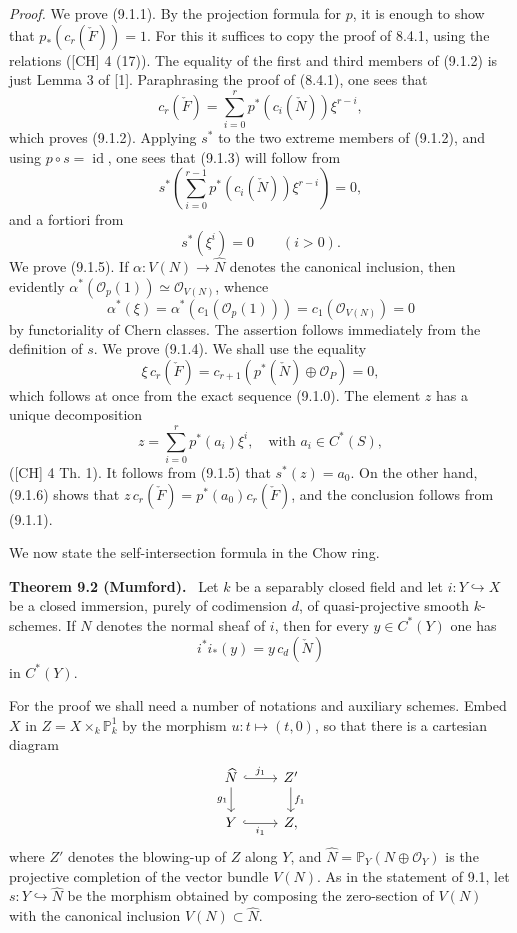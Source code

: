\documentclass[11pt]{article}
\newenvironment{statement}[1]{\par\medskip\noindent\textbf{#1.}\ }{\par\medskip}
\begin{document}
\emph{Proof.} We prove (9.1.1). By the projection formula for $p$, it is enough to show that $p_*(c_r(\check F))=1$. For this it suffices to copy the proof of 8.4.1, using the relations ([CH] 4 (17)). The equality of the first and third members of (9.1.2) is just Lemma 3 of [1]. Paraphrasing the proof of (8.4.1), one sees that
\[
c_r(\check F)=\sum_{i=0}^r p^*(c_i(\check N))\xi^{r-i},
\tag{9.1.2 bis}
\]
which proves (9.1.2). Applying $s^*$ to the two extreme members of (9.1.2), and using $p\circ s=\operatorname{id}$, one sees that (9.1.3) will follow from
\[
s^*\left(\sum_{i=0}^{r-1}p^*(c_i(\check N))\xi^{r-i}\right)=0,
\]
and a fortiori from
\[
s^*(\xi^i)=0\qquad(i>0).
\tag{9.1.5}
\]
We prove (9.1.5). If $\alpha:V(N)\to\widehat N$ denotes the canonical inclusion, then evidently $\alpha^*(\mathcal O_p(1))\simeq\mathcal O_{V(N)}$, whence
\[
\alpha^*(\xi)=\alpha^*(c_1(\mathcal O_p(1)))=c_1(\mathcal O_{V(N)})=0
\]
by functoriality of Chern classes. The assertion follows immediately from the definition of $s$. We prove (9.1.4). We shall use the equality
\[
\xi\,c_r(\check F)=c_{r+1}(p^*(\check N)\oplus\mathcal O_P)=0,
\tag{9.1.6}
\]
which follows at once from the exact sequence (9.1.0). The element $z$ has a unique decomposition
\[
z=\sum_{i=0}^r p^*(a_i)\xi^i,\quad\text{with }a_i\in C^*(S),
\]
([CH] 4 Th. 1). It follows from (9.1.5) that $s^*(z)=a_0$. On the other hand, (9.1.6) shows that $z\,c_r(\check F)=p^*(a_0)c_r(\check F)$, and the conclusion follows from (9.1.1).

We now state the self-intersection formula in the Chow ring.

\begin{statement}{Theorem 9.2 (Mumford)}
Let $k$ be a separably closed field and let $i:Y\hookrightarrow X$ be a closed immersion, purely of codimension $d$, of quasi-projective smooth $k$-schemes. If $N$ denotes the normal sheaf of $i$, then for every $y\in C^*(Y)$ one has
\[
i^*i_*(y)=y\,c_d(\check N)
\]
in $C^*(Y)$.
\end{statement}

For the proof we shall need a number of notations and auxiliary schemes. Embed $X$ in $Z=X\times_k\mathbb P^1_k$ by the morphism $u:t\mapsto(t,0)$, so that there is a cartesian diagram
\[
\begin{tikzcd}
\widehat N \arrow[r,hook,"j_1"] \arrow[d,"g_1"'] & Z' \arrow[d,"f_1"]\\
Y \arrow[r,hook,"i_1"'] & Z ,
\end{tikzcd}
\]
where $Z'$ denotes the blowing-up of $Z$ along $Y$, and $\widehat N=\mathbb P_Y(N\oplus\mathcal O_Y)$ is the projective completion of the vector bundle $V(N)$. As in the statement of 9.1, let $s:Y\hookrightarrow\widehat N$ be the morphism obtained by composing the zero-section of $V(N)$ with the canonical inclusion $V(N)\subset\widehat N$.
\end{document}
